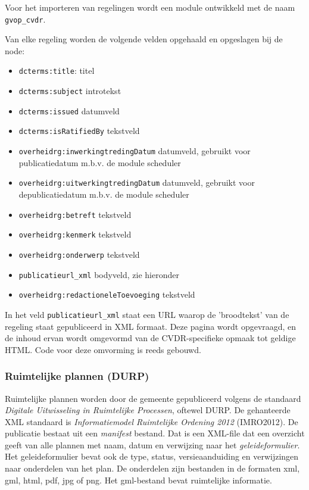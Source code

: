 Voor het importeren van regelingen wordt een module ontwikkeld met de naam \texttt{gvop\_cvdr}.

Van elke regeling worden de volgende velden opgehaald en opgeslagen bij de node:

\begin{itemize}
\item \texttt{dcterms:title}: titel
\item \texttt{dcterms:subject} introtekst
\item \texttt{dcterms:issued} datumveld
\item \texttt{dcterms:isRatifiedBy} tekstveld
\item \texttt{overheidrg:inwerkingtredingDatum} datumveld, gebruikt voor publicatiedatum m.b.v. de module scheduler
\item \texttt{overheidrg:uitwerkingtredingDatum} datumveld, gebruikt voor depublicatiedatum m.b.v. de module scheduler
\item \texttt{overheidrg:betreft} tekstveld
\item \texttt{overheidrg:kenmerk} tekstveld
\item \texttt{overheidrg:onderwerp} tekstveld
\item \texttt{publicatieurl\_xml} bodyveld, zie hieronder
\item \texttt{overheidrg:redactioneleToevoeging} tekstveld
\end{itemize}

In het veld \texttt{publicatieurl\_xml} staat een URL waarop de 'broodtekst' van de regeling staat gepubliceerd in XML formaat. Deze pagina wordt opgevraagd, en de inhoud ervan wordt omgevormd van de CVDR-specifieke opmaak tot geldige HTML. Code voor deze omvorming is reeds gebouwd.

\subsubsection{Ruimtelijke plannen (DURP)}

Ruimtelijke plannen worden door de gemeente gepubliceerd volgens de standaard \emph{Digitale Uitwisseling in Ruimtelijke Processen}, oftewel DURP. De gehanteerde XML standaard is \emph{Informatiemodel Ruimtelijke Ordening 2012} (IMRO2012). De publicatie bestaat uit een \emph{manifest} bestand. Dat is een XML-file dat een overzicht geeft van alle plannen met naam, datum en verwijzing naar het \emph{geleideformulier}. Het geleideformulier bevat ook de type, status, versieaanduiding en verwijzingen naar onderdelen van het plan. De onderdelen zijn bestanden in de formaten xml, gml, html, pdf, jpg of png. Het gml-bestand bevat ruimtelijke informatie.

